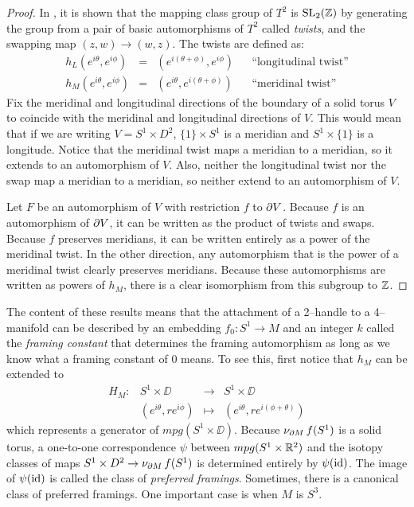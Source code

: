 \begin{proof}
	In \cite{Rolf76}, it is shown that the mapping class group of $T^2$ is $\textrm{SL}_2(\mathbb{Z})$ by generating the group from a pair of basic automorphisms of $T^2$ called \emph{twists}, and the swapping map $(z,w)\to(w,z)$.
	The twists are defined as:
	\[
	\begin{array}{ccccc}
	h_L(e^{i\theta},e^{i\phi}) & = & (e^{i(\theta+\phi)},e^{i\phi}) & & \textrm{``longitudinal twist''} \\
	
	h_M(e^{i\theta},e^{i\phi}) & = & (e^{i\theta},e^{i(\theta+\phi)}) & & \textrm{``meridinal twist''}	
	\end{array}
	\]
	Fix the meridinal and longitudinal directions of the boundary of a solid torus $V$ to coincide with the meridinal and longitudinal directions of $V$.
	This would mean that if we are writing $V=S^1\times D^2$, $\{1\}\times S^1$ is a meridian and $S^1\times\{1\}$ is a longitude.
	Notice that the meridinal twist maps a meridian to a meridian, so it extends to an automorphism of $V$.
	Also, neither the longitudinal twist nor the swap map a meridian to a meridian, so neither extend to an automorphism of $V$.
	
	Let $F$ be an automorphism of $V$ with restriction $f$ to $\partial V$.
	Because $f$ is an automorphism of $\partial V$, it can be written as the product of twists and swaps.
	Because $f$ preserves meridians, it can be written entirely as a power of the meridinal twist.
	In the other direction, any automorphism that is the power of a meridinal twist clearly preserves meridians.
	Because these automorphisms are written as powers of $h_M$, there is a clear isomorphism from this subgroup to $\mathbb{Z}$.
\end{proof}

The content of these results means that the attachment of a 2--handle to a 4--manifold can be described by an embedding $f_0:S^1\to M$ and an integer $k$ called the \emph{framing constant} that determines the framing automorphism as long as we know what a framing constant of $0$ means.
To see this, first notice that $h_M$ can be extended to
\[
	\begin{array}{cccc}
		H_M: & S^1\times\DD & \to & S^1\times\DD \\
			& (e^{i\theta}, re^{i\phi}) & \mapsto & (e^{i\theta},re^{i(\phi+\theta)})	
	\end{array}
\]
which represents a generator of $mpg(S^1\times\DD)$.
Because $\nu_{\partial M}\,f(S^1)$ is a solid torus, a one-to-one correspondence
$\psi$ between $mpg(S^1\times\mathbb{R}^2)$ and the isotopy classes of maps $S^1\times D^2\to\nu_{\partial M}\,f(S^1)$ is determined entirely by $\psi(\mathrm{id})$.
The image of $\psi(\mathrm{id})$ is called the class of \emph{preferred framings}.
Sometimes, there is a canonical class of preferred framings.
One important case is when $M$ is $S^3$.

